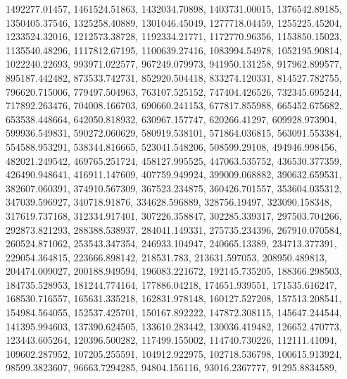 \begin{code}
\begin{hide}
{     1492277.01457,     1461524.51863,     1432034.70898,
     1403731.00015,     1376542.89185,     1350405.37546,
     1325258.40889,     1301046.45049,     1277718.04459,
     1255225.45204,     1233524.32016,     1212573.38728,
     1192334.21771,     1172770.96356,     1153850.15023,
     1135540.48296,     1117812.67195,     1100639.27416,
     1083994.54978,     1052195.90814,     1022240.22693,
     993971.022577,     967249.079973,     941950.131258,
     917962.899577,     895187.442482,     873533.742731,
     852920.504418,     833274.120331,     814527.782755,
     796620.715006,     779497.504963,     763107.525152,
     747404.426526,     732345.695244,     717892.263476,
     704008.166703,     690660.241153,     677817.855988,
     665452.675682,     653538.448664,     642050.818932,
     630967.157747,      620266.41297,     609928.973904,
     599936.549831,     590272.060629,     580919.538101,
     571864.036815,     563091.553384,     554588.953291,
     538344.816665,     523041.548206,      508599.29108,
     494946.998456,     482021.249542,     469765.251724,
     458127.995525,     447063.535752,     436530.377359,
     426490.948641,     416911.147609,     407759.949924,
     399009.068882,     390632.659531,     382607.060391,
     374910.567309,     367523.234875,     360426.701557,
     353604.035312,     347039.596927,      340718.91876,
     334628.596889,      328756.19497,     323090.158348,
     317619.737168,     312334.917401,     307226.358847,
     302285.339317,     297503.704266,     292873.821293,
     288388.538937,     284041.149331,     275735.234396,
     267910.070584,     260524.871062,     253543.347354,
     246933.104947,      240665.13389,     234713.377391,
     229054.364815,     223666.898142,        218531.783,
     213631.597053,     208950.489813,     204474.009027,
     200188.949594,     196083.221672,     192145.735205,
     188366.298503,     184735.528953,     181244.774164,
      177886.04218,     174651.939551,     171535.616247,
     168530.716557,     165631.335218,     162831.978148,
     160127.527208,     157513.208541,     154984.564055,
     152537.425701,     150167.892222,     147872.308115,
     145647.244544,     141395.994603,     137390.624505,
     133610.283442,     130036.419482,     126652.470773,
     123443.605264,     120396.500282,     117499.155002,
     114740.730226,      112111.41094,     109602.287952,
     107205.255591,     104912.922975,     102718.536798,
     100615.913924,     98599.3823607,     96663.7294285,
      94804.156116,     93016.2367777,     91295.8834589,
}
\end{hide}
\end{code}
